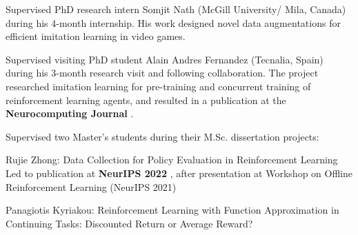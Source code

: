 \documentclass[a4paper,12pt]{article}
\begin{document}
\begin{expblock}
    Supervised PhD research intern Somjit Nath (McGill University/ Mila, Canada) during his 4-month internship. His work designed novel data augmentations for efficient imitation learning in video games.%
\end{expblock}

\newpage
{}
\begin{expblock}
    Supervised visiting PhD student Alain Andres Fernandez (Tecnalia, Spain) during his 3-month research visit and following collaboration. The project researched imitation learning for pre-training and concurrent training of reinforcement learning agents, and resulted in a publication at the \textbf{Neurocomputing Journal} \cite{andres2024using}.
\end{expblock}

\begin{expblock}
    Supervised two Master's students during their M.Sc. dissertation projects:
    \begin{explist}
	\item Rujie Zhong: Data Collection for Policy Evaluation in Reinforcement Learning\\
	Led to publication at \textbf{NeurIPS 2022} \cite{zhong2022datacollection}, after presentation at Workshop on Offline Reinforcement Learning (NeurIPS 2021)
	\item Panagiotis Kyriakou: Reinforcement Learning with Function Approximation in Continuing Tasks: Discounted Return or Average Reward?
    \end{explist}
\end{expblock}

\end{document}
